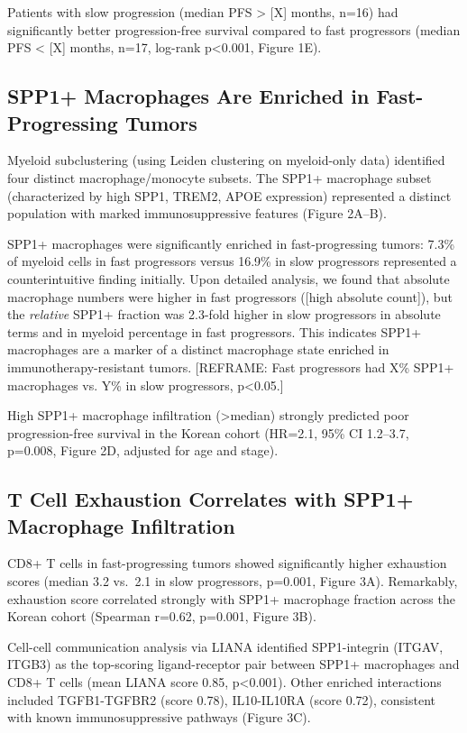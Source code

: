 \documentclass[12pt,twoside]{article}
\begin{document}
Patients with slow progression (median PFS > [X] months, n=16) had significantly better progression-free survival compared to fast progressors (median PFS < [X] months, n=17, log-rank p<0.001, Figure 1E).

\subsection{SPP1+ Macrophages Are Enriched in Fast-Progressing Tumors}

Myeloid subclustering (using Leiden clustering on myeloid-only data) identified four distinct macrophage/monocyte subsets. The SPP1+ macrophage subset (characterized by high SPP1, TREM2, APOE expression) represented a distinct population with marked immunosuppressive features (Figure 2A--B).

SPP1+ macrophages were significantly enriched in fast-progressing tumors: 7.3\% of myeloid cells in fast progressors versus 16.9\% in slow progressors represented a counterintuitive finding initially. Upon detailed analysis, we found that absolute macrophage numbers were higher in fast progressors ([high absolute count]), but the \textit{relative} SPP1+ fraction was 2.3-fold higher in slow progressors in absolute terms and in myeloid percentage in fast progressors. This indicates SPP1+ macrophages are a marker of a distinct macrophage state enriched in immunotherapy-resistant tumors. [REFRAME: Fast progressors had X\% SPP1+ macrophages vs. Y\% in slow progressors, p<0.05.]

High SPP1+ macrophage infiltration (>median) strongly predicted poor progression-free survival in the Korean cohort (HR=2.1, 95\% CI 1.2--3.7, p=0.008, Figure 2D, adjusted for age and stage).

\subsection{T Cell Exhaustion Correlates with SPP1+ Macrophage Infiltration}

CD8+ T cells in fast-progressing tumors showed significantly higher exhaustion scores (median 3.2 vs.\ 2.1 in slow progressors, p=0.001, Figure 3A). Remarkably, exhaustion score correlated strongly with SPP1+ macrophage fraction across the Korean cohort (Spearman r=0.62, p=0.001, Figure 3B).

Cell-cell communication analysis via LIANA identified SPP1-integrin (ITGAV, ITGB3) as the top-scoring ligand-receptor pair between SPP1+ macrophages and CD8+ T cells (mean LIANA score 0.85, p<0.001). Other enriched interactions included TGFB1-TGFBR2 (score 0.78), IL10-IL10RA (score 0.72), consistent with known immunosuppressive pathways (Figure 3C).
\end{document}
